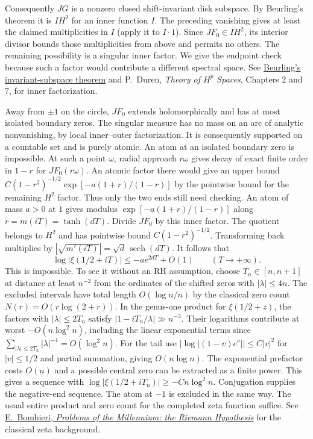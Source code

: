 \documentclass[11pt,letterpaper]{article}
\begin{document}
Consequently $JG$ is a nonzero closed shift-invariant disk subspace. By Beurling's theorem it is $I H^2$ for an inner function $I$. The preceding vanishing gives at least the claimed multiplicities in $I$ (apply it to $I\cdot1$). Since $JF_0\in I H^2$, its interior divisor bounds those multiplicities from above and permits no others. The remaining possibility is a singular inner factor. We give the endpoint check because such a factor would contribute a different spectral space. See \href{https://archive.ymsc.tsinghua.edu.cn/pacm_download/117/5689-11511_2006_Article_BF02395019.pdf}{Beurling's invariant-subspace theorem} and P.~Duren, \emph{Theory of $H^p$ Spaces}, Chapters 2 and 7, for inner factorization.

Away from $\pm1$ on the circle, $JF_0$ extends holomorphically and has at most isolated boundary zeros. The singular measure has no mass on an arc of analytic nonvanishing, by local inner--outer factorization. It is consequently supported on a countable set and is purely atomic. An atom at an isolated boundary zero is impossible. At such a point $\omega$, radial approach $r\omega$ gives decay of exact finite order in $1-r$ for $JF_0(r\omega)$. An atomic factor there would give an upper bound $C(1-r^2)^{-1/2}\exp[-a(1+r)/(1-r)]$ by the pointwise bound for the remaining $H^2$ factor. Thus only the two ends still need checking. An atom of mass $a>0$ at $1$ gives modulus $\exp[-a(1+r)/(1-r)]$ along $r=m(iT)=\tanh(dT)$. Divide $JF_0$ by this inner factor. The quotient belongs to $H^2$ and has pointwise bound $C(1-r^2)^{-1/2}$. Transforming back multiplies by $|\sqrt{m'(iT)}|=\sqrt d\,\operatorname{sech}(dT)$. It follows that
\[
 \log|\xi(1/2+iT)|\le -a e^{2dT}+O(1)\qquad (T\longrightarrow+\infty).
\]
This is impossible. To see it without an RH assumption, choose $T_n\in[n,n+1]$ at distance at least $n^{-2}$ from the ordinates of the shifted zeros with $|\lambda|\le4n$. The excluded intervals have total length $O(\log n/n)$ by the classical zero count $N(r)=O(r\log(2+r))$. In the genus-one product for $\xi(1/2+z)$, the factors with $|\lambda|\le2T_n$ satisfy $|1-iT_n/\lambda|\gg n^{-3}$. Their logarithms contribute at worst $-O(n\log^2 n)$, including the linear exponential terms since $\sum_{|\lambda|\le 2T_n}|\lambda|^{-1}=O(\log^2 n)$. For the tail use $|\log|(1-v)e^v||\le C|v|^2$ for $|v|\le1/2$ and partial summation, giving $O(n\log n)$. The exponential prefactor costs $O(n)$ and a possible central zero can be extracted as a finite power. This gives a sequence with $\log|\xi(1/2+iT_n)|\ge-Cn\log^2 n$. Conjugation supplies the negative-end sequence. The atom at $-1$ is excluded in the same way. The usual entire product and zero count for the completed zeta function suffice. See \href{https://www.claymath.org/wp-content/uploads/2022/05/riemann.pdf}{E.~Bombieri, \emph{Problems of the Millennium: the Riemann Hypothesis}} for the classical zeta background.
\end{document}
